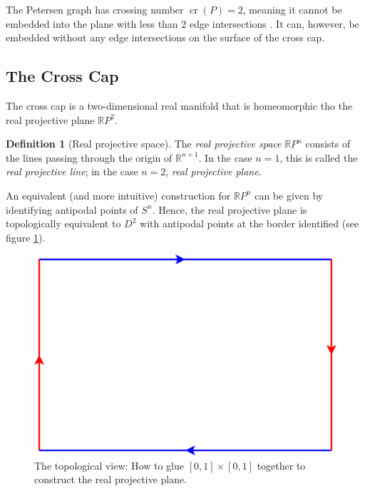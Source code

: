 \documentclass[12pt,            %
               a4paper,         %
               oneside,         %
               DIV12,           %
               fleqn,           %
               halfparskip,     %
               nochapterprefix, %
              ]{scrartcl} %
\theoremstyle{definition}
\newtheorem{definition}{Definition}
\begin{document}
The Petersen graph has crossing number $\operatorname{cr}(P) = 2$,
meaning it cannot be embedded into the plane with less than 2 edge
intersections \cite[p.~2]{crossingnr}. It can, however, be embedded
without any edge intersections on the surface of the cross cap.

\subsection{The Cross Cap}

\begin{minipage}{0.55\textwidth}
  The cross cap is a two-dimensional real manifold that is homeomorphic
  tho the real projective plane $\mathbb{R}P^2$.

  \begin{definition}[Real projective space]
    The \emph{real projective space} $\mathbb{R}P^n$ consists of the lines
    passing through the origin of $\mathbb{R}^{n+1}$. In the case $n=1$,
    this is called the \emph{real projective line}; in the case $n=2$,
    \emph{real projective plane}.
  \end{definition}

  An equivalent (and more intuitive) construction for $\mathbb{R}P^n$
  can be given by identifying antipodal points of $S^n$. Hence, the real
  projective plane is topologically equivalent to $D^2$ with antipodal
  points at the border identified (see figure \ref{fig:rp2}).
\end{minipage}%
\hfill%
\begin{minipage}{0.35\textwidth}
  \begin{figure}[H]
    \centering
    \includegraphics[keepaspectratio=true,width=\textwidth]{../planar-graphs/crosscap-construction.pdf}
    \caption{The topological view: How to glue $[0,1]\times[0,1]$
      together to construct the real projective plane.}
    \label{fig:rp2}
  \end{figure}
\end{minipage}%
\end{document}
